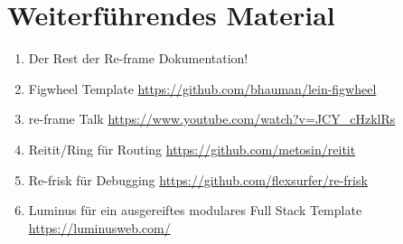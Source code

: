 \documentclass[11pt,a4paper]{article}
\theoremstyle{break}
\begin{document}
\section{Weiterführendes Material}

\begin{enumerate}
 \item Der Rest der Re-frame Dokumentation!
 \item Figwheel Template \url{https://github.com/bhauman/lein-figwheel}
 \item re-frame Talk \url{https://www.youtube.com/watch?v=JCY_cHzklRs}
 \item Reitit/Ring für Routing \url{https://github.com/metosin/reitit}
 \item Re-frisk für Debugging \url{https://github.com/flexsurfer/re-frisk}
 \item Luminus für ein ausgereiftes modulares Full Stack Template \url{https://luminusweb.com/}
\end{enumerate}
\end{document}
